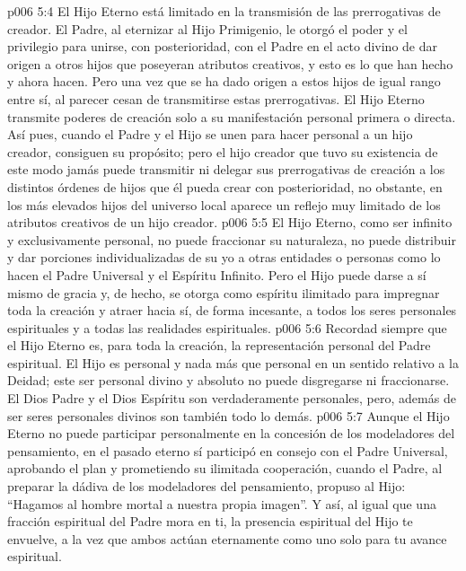 \vs p006 5:4 El Hijo Eterno está limitado en la transmisión de las prerrogativas de creador. El Padre, al eternizar al Hijo Primigenio, le otorgó el poder y el privilegio para unirse, con posterioridad, con el Padre en el acto divino de dar origen a otros hijos que poseyeran atributos creativos, y esto es lo que han hecho y ahora hacen. Pero una vez que se ha dado origen a estos hijos de igual rango entre sí, al parecer cesan de transmitirse estas prerrogativas. El Hijo Eterno transmite poderes de creación solo a su manifestación personal primera o directa. Así pues, cuando el Padre y el Hijo se unen para hacer personal a un hijo creador, consiguen su propósito; pero el hijo creador que tuvo su existencia de este modo jamás puede transmitir ni delegar sus prerrogativas de creación a los distintos órdenes de hijos que él pueda crear con posterioridad, no obstante, en los más elevados hijos del universo local aparece un reflejo muy limitado de los atributos creativos de un hijo creador.
\vs p006 5:5 El Hijo Eterno, como ser infinito y exclusivamente personal, no puede fraccionar su naturaleza, no puede distribuir y dar porciones individualizadas de su yo a otras entidades o personas como lo hacen el Padre Universal y el Espíritu Infinito. Pero el Hijo puede darse a sí mismo de gracia y, de hecho, se otorga como espíritu ilimitado para impregnar toda la creación y atraer hacia sí, de forma incesante, a todos los seres personales espirituales y a todas las realidades espirituales.
\vs p006 5:6 Recordad siempre que el Hijo Eterno es, para toda la creación, la representación personal del Padre espiritual. El Hijo es personal y nada más que personal en un sentido relativo a la Deidad; este ser personal divino y absoluto no puede disgregarse ni fraccionarse. El Dios Padre y el Dios Espíritu son verdaderamente personales, pero, además de ser seres personales divinos son también todo lo demás.
\vs p006 5:7 Aunque el Hijo Eterno no puede participar personalmente en la concesión de los modeladores del pensamiento, en el pasado eterno sí participó en consejo con el Padre Universal, aprobando el plan y prometiendo su ilimitada cooperación, cuando el Padre, al preparar la dádiva de los modeladores del pensamiento, propuso al Hijo: “Hagamos al hombre mortal a nuestra propia imagen”. Y así, al igual que una fracción espiritual del Padre mora en ti, la presencia espiritual del Hijo te envuelve, a la vez que ambos actúan eternamente como uno solo para tu avance espiritual.
